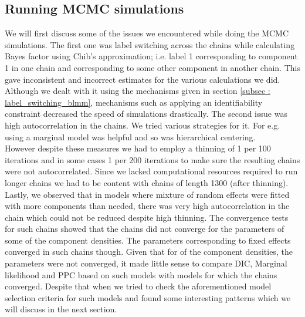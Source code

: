 \subsection{Running MCMC simulations}
We will first discuss some of the issues we encountered while doing the MCMC simulations. The first one was label switching across the chains while calculating Bayes factor using Chib's approximation; i.e. label 1 corresponding to component 1 in one chain and corresponding to some other component in another chain. This gave inconsistent and incorrect estimates for the various calculations we did. Although we dealt with it using the mechanisms given in section \ref{subsec : label_switching_blmm}, mechanisms such as applying an identifiability constraint decreased the speed of simulations drastically. The second issue was high autocorrelation in the chains. We tried various strategies for it. For e.g. using a marginal model was helpful and so was hierarchical centering.\\

However despite these measures we had to employ a thinning of 1 per 100 iterations and in some cases 1 per 200 iterations to make sure the resulting chains were not autocorrelated. Since we lacked computational resources required to run longer chains we had to be content with chains of length 1300 (after thinning). Lastly, we observed that in models where mixture of random effects were fitted with more components than needed, there was very high autocorrelation in the chain which could not be reduced despite high thinning. The convergence tests for such chains showed that the chains did not converge for the parameters of some of the component densities. The parameters corresponding to fixed effects converged in such chains though. Given that for of the component densities, the parameters were not converged, it made little sense to compare DIC, Marginal likelihood and PPC based on such models with models for which the chains converged. Despite that when we tried to check the aforementioned model selection criteria for such models and found some interesting patterns which we will discuss in the next section.

